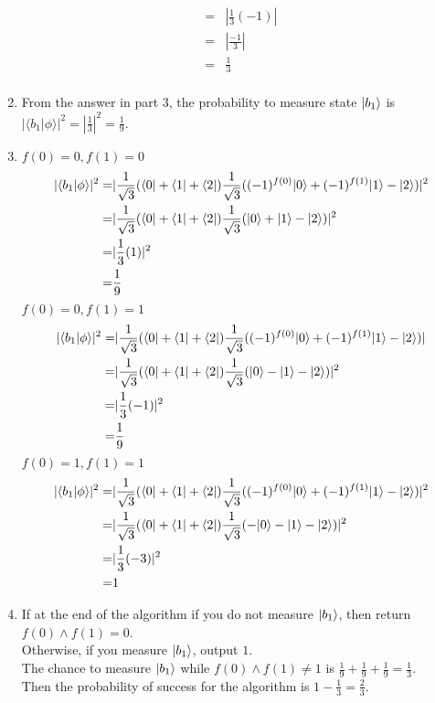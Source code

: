 \documentclass{assignment}
\newcommand{\inner}[2]{\ensuremath{\langle{#1}|{#2}\rangle}}
\begin{document}
\begin{problemlist}
\begin{answer}
\begin{enumerate}
\begin{align*}
        =&|\frac{1}{3}(-1)|\\
        =&|\frac{-1}{3}|\\
        =&\frac{1}{3}\\
      \end{align*}
    \item
      From the answer in part 3, the probability to measure state ${\left\vert{b_1}\right\rangle}$ is
      $|\inner{b_1}{\phi}|^2=|\frac{1}{3}|^2=\frac{1}{9}$.\\
    \item
      $f(0)=0,f(1)=0$\\
      \begin{align*}
        |\inner{b_1}{\phi}|^2=&|\frac{1}{\sqrt{3}}(\bra{0}+\bra{1}+\bra{2})\frac{1}{\sqrt{3}}((-1)^{f(0)}\ket{0}+(-1)^{f(1)}\ket{1}-\ket{2})|^2\\
        =&|\frac{1}{\sqrt{3}}(\bra{0}+\bra{1}+\bra{2})\frac{1}{\sqrt{3}}(\ket{0}+\ket{1}-\ket{2})|^2\\
        =&|\frac{1}{3}(1)|^2\\
        =&\frac{1}{9}\\
      \end{align*}
      $f(0)=0,f(1)=1$\\
      \begin{align*}
        |\inner{b_1}{\phi}|^2=&|\frac{1}{\sqrt{3}}(\bra{0}+\bra{1}+\bra{2})\frac{1}{\sqrt{3}}((-1)^{f(0)}\ket{0}+(-1)^{f(1)}\ket{1}-\ket{2})|\\
        =&|\frac{1}{\sqrt{3}}(\bra{0}+\bra{1}+\bra{2})\frac{1}{\sqrt{3}}(\ket{0}-\ket{1}-\ket{2})|^2\\
        =&|\frac{1}{3}(-1)|^2\\
        =&\frac{1}{9}\\
      \end{align*}
      $f(0)=1,f(1)=1$\\
      \begin{align*}
        |\inner{b_1}{\phi}|^2=&|\frac{1}{\sqrt{3}}(\bra{0}+\bra{1}+\bra{2})\frac{1}{\sqrt{3}}((-1)^{f(0)}\ket{0}+(-1)^{f(1)}\ket{1}-\ket{2})|^2\\
        =&|\frac{1}{\sqrt{3}}(\bra{0}+\bra{1}+\bra{2})\frac{1}{\sqrt{3}}(-\ket{0}-\ket{1}-\ket{2})|^2\\
        =&|\frac{1}{3}(-3)|^2\\
        =&1\\
      \end{align*}
    \item
      If at the end of the algorithm if you do not measure ${\left\vert{b_1}\right\rangle}$, then return $f(0)\land f(1)=0$.\\
      Otherwise, if you measure ${\left\vert{b_1}\right\rangle}$, output $1$.\\
      The chance to measure ${\left\vert{b_1}\right\rangle}$ while $f(0)\land f(1) \neq 1$ is $\frac{1}{9}+ \frac{1}{9}+ \frac{1}{9} = \frac{1}{3}$.\\
      Then the probability of success for the algorithm is $1-\frac{1}{3}=\frac{2}{3}$.\\
    \end{enumerate}
  \end{answer}


\end{problemlist}
\end{document}
